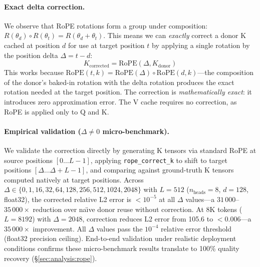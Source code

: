 \documentclass[10pt,twocolumn]{article}
\begin{document}
\paragraph{Exact delta correction.}
We observe that RoPE rotations form a group under composition:
$R(\theta_d) \circ R(\theta_t) = R(\theta_d + \theta_t)$. This means
we can \emph{exactly} correct a donor K cached at position $d$ for use
at target position $t$ by applying a single rotation by the position
delta $\Delta = t - d$:
\begin{equation}
  K_\text{corrected} = \text{RoPE}(\Delta, K_\text{donor})
  \label{eq:rope-correction}
\end{equation}
This works because $\text{RoPE}(t, k) = \text{RoPE}(\Delta) \circ
\text{RoPE}(d, k)$---the composition of the donor's baked-in rotation
with the delta rotation produces the exact rotation needed at the target
position. The correction is \emph{mathematically exact}: it introduces
zero approximation error. The V cache requires no correction, as RoPE
is applied only to Q and K.

\paragraph{Empirical validation ($\Delta{\neq}0$ micro-benchmark).}
We validate the correction directly by generating K tensors via
standard RoPE at source positions $[0{\ldots}L{-}1]$, applying
\texttt{rope\_correct\_k} to shift to target positions
$[\Delta{\ldots}\Delta{+}L{-}1]$, and comparing against ground-truth K
tensors computed natively at target positions. Across $\Delta \in
\{0, 1, 16, 32, 64, 128, 256, 512, 1024, 2048\}$ with
$L{=}512$ ($n_\text{heads}{=}8$, $d{=}128$, float32), the corrected
relative L2 error is $< 10^{-5}$ at all $\Delta$ values---a
$31\,000$--$35\,000{\times}$ reduction over na\"{\i}ve donor reuse
without correction. At 8K tokens ($L{=}8192$) with $\Delta{=}2048$,
correction reduces L2 error from 105.6 to $< 0.006$---a $35\,000\times$
improvement. All $\Delta$ values pass the $10^{-4}$ relative error
threshold (float32 precision ceiling). End-to-end validation under
realistic deployment conditions confirms these micro-benchmark results
translate to 100\% quality recovery (\S\ref{sec:analysis:rope}).
\end{document}
